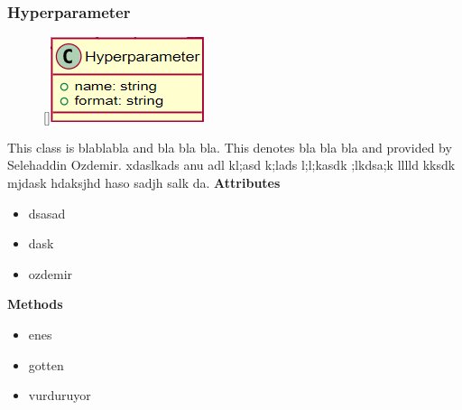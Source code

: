 \subsubsection{Hyperparameter}
\begin{figure}
    \raisebox{0pt}[\dimexpr{}\baselineskip\relax]{\includegraphics[width=4.5cm]{classes/model-management/13.png}}
\end{figure} 
\par
This class is blablabla and bla bla bla. This denotes bla bla bla and provided by Selehaddin Ozdemir. xdaslkads anu adl kl;asd k;lads l;l;kasdk ;lkdsa;k lllld kksdk mjdask hdaksjhd haso sadjh salk da.
\newline
\newline
\textbf{Attributes}
\begin{itemize}
    \item dsasad
    \item dask
    \item ozdemir
\end{itemize}
\textbf{Methods}
\begin{itemize}
    \item enes
    \item gotten
    \item vurduruyor
\end{itemize}

